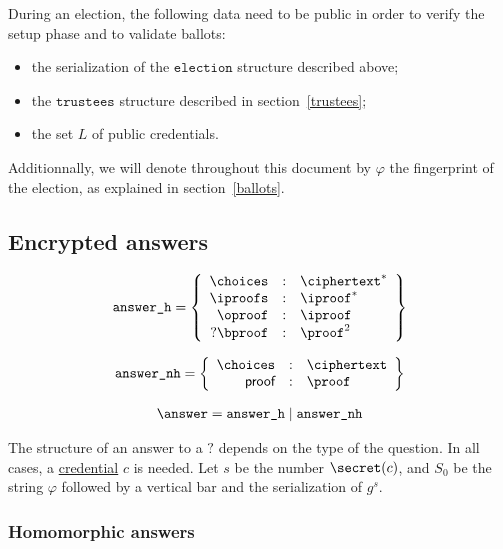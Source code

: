 \documentclass[a4paper]{article}
\newcommand{\election}{\texttt{election}}
\begin{document}
During an election, the following data need to be public in order to
verify the setup phase and to validate ballots:
\begin{itemize}
\item the serialization of the $\election$ structure described above;
\item the $\texttt{trustees}$ structure described in
  section~\ref{trustees};
\item the set $L$ of public credentials.
\end{itemize}

Additionnally, we will denote throughout this document by $\varphi$
the fingerprint of the election, as explained in
section~\ref{ballots}.

\subsection{Encrypted answers}
\label{answers}

\begin{gather*}
  \texttt{answer\_h}=\left\{
    \begin{array}{rcl}
      \choices&:&\ciphertext^\ast\\
      \iproofs&:&\iproof^\ast\\
      \oproof&:&\iproof\\
      ?\bproof&:&\proof^2
    \end{array}
  \right\}
\end{gather*}

\begin{gather*}
  \texttt{answer\_nh}=\left\{
    \begin{array}{rcl}
      \choices&:&\ciphertext\\
      \textsf{proof}&:&\proof
    \end{array}
  \right\}
\end{gather*}

\begin{gather*}
  \answer=\texttt{answer\_h}\mid\texttt{answer\_nh}
\end{gather*}

The structure of an answer to a \hyperref[elections]{$\question$}
depends on the type of the question. In all cases, a
\hyperref[credentials]{credential} $c$ is needed. Let $s$ be the
number $\secret(c)$, and $S_0$ be the string $\varphi$ followed by a
vertical bar and the serialization of $g^s$.

\subsubsection{Homomorphic answers}
\end{document}
